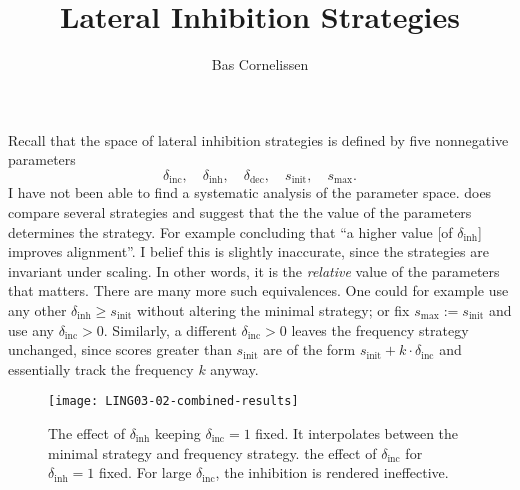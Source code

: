 \documentclass{../src/bcthesispart}
\title{Lateral Inhibition Strategies}
\author{Bas Cornelissen}
\begin{document}


\noindent
Recall that the space of lateral inhibition strategies is defined by five nonnegative parameters
\begin{equation}
	\delta_{\text{inc}}, \quad
	\delta_{\text{inh}}, \quad
	\delta_{\text{dec}}, \quad
	s_{\text{init}}, \quad 
	s_{\text{max}}.	
\end{equation}
I have not been able to find a systematic analysis of the parameter space.
\textcite{Wellens2012} does compare several strategies and suggest that the the value of the parameters determines the strategy. 
For example concluding that “a higher value [of $\delta_{\text{inh}}$] improves alignment”.
I belief this is slightly inaccurate, since the strategies are invariant under scaling.
In other words, it is the \emph{relative} value of the parameters that matters.
There are many more such equivalences.
One could for example use any other
$\delta_{\text{inh}} \ge s_{\text{init}}$ without altering the minimal strategy; or fix $s_{\text{max}} := s_{\text{init}}$ and use any $\delta_{\text{inc}}>0$.
Similarly, a different $\delta_{\text{inc}} > 0$ leaves the frequency strategy unchanged, since scores greater than $s_{\text{init}}$ are of the form $s_\text{init} + k\cdot \delta_{\text{inc}}$ and essentially track the frequency $k$ anyway.




\begin{SCfigure}
	\texttt{[image: LING03-02-combined-results]}
	\caption{ The effect of $\delta_{\text{inh}}$ keeping $\delta_{\text{inc}} = 1$ fixed. It interpolates between the minimal strategy and frequency strategy.  the effect of $\delta_{\text{inc}}$ for $\delta_{\text{inh}} = 1$ fixed. For large $\delta_{\text{inc}}$, the inhibition is rendered ineffective.
		\label{fig:delta-inh-vs-delta-inc}}
\end{SCfigure}
\end{document}
